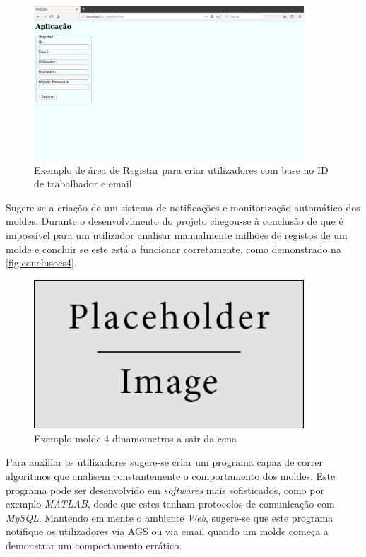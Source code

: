 \documentclass[11pt,twoside,a4paper]{report}
\begin{document}
\begin{figure}[H]
	\begin{center}
		\includegraphics[width=0.9\textwidth]{futuro02} %
		\caption{Exemplo de área de Registar para criar utilizadores com base no ID de trabalhador e email}
		\label{fig:conclusoes2}
	\end{center}
\end{figure}
Sugere-se a criação de um sistema de notificações e monitorização automático dos moldes. Durante o desenvolvimento do projeto chegou-se à conclusão de que é impossível para um utilizador analisar manualmente milhões de registos de um molde e concluir se este está a funcionar corretamente, como demonstrado na \autoref{fig:conclusoes4}.
\begin{figure}[H]
	\begin{center}
		\includegraphics[width=0.9\textwidth]{placeholder} %
		\caption{Exemplo molde 4 dinamometros a sair da cena}
		\label{fig:conclusoes4}
	\end{center}
\end{figure}
Para auxiliar os utilizadores sugere-se criar um programa capaz de correr algoritmos que analisem constantemente o comportamento dos moldes. Este programa pode ser desenvolvido em \textit{softwares} mais sofisticados, como por exemplo \textit{MATLAB}, desde que estes tenham protocolos de comunicação com \textit{MySQL}. Mantendo em mente o ambiente \textit{Web}, sugere-se que este programa notifique os utilizadores via AGS ou via email quando um molde começa a demonstrar um comportamento errático.
\end{document}

